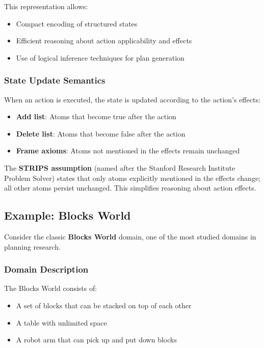\documentclass[11pt,a4paper]{article}
\theoremstyle{definition}
\theoremstyle{plain}
\theoremstyle{remark}
\begin{document}
This representation allows:
\begin{itemize}
    \item Compact encoding of structured states
    \item Efficient reasoning about action applicability and effects
    \item Use of logical inference techniques for plan generation
\end{itemize}

\subsubsection{State Update Semantics}

When an action is executed, the state is updated according to the action's effects:

\begin{itemize}
    \item \textbf{Add list}: Atoms that become true after the action
    \item \textbf{Delete list}: Atoms that become false after the action
    \item \textbf{Frame axioms}: Atoms not mentioned in the effects remain unchanged
\end{itemize}

The \textbf{STRIPS assumption} (named after the Stanford Research Institute Problem Solver) states that only atoms explicitly mentioned in the effects change; all other atoms persist unchanged. This simplifies reasoning about action effects.

\newpage

\subsection{Example: Blocks World}

Consider the classic \textbf{Blocks World} domain, one of the most studied domains in planning research.

\subsubsection{Domain Description}

The Blocks World consists of:
\begin{itemize}
    \item A set of blocks that can be stacked on top of each other
    \item A table with unlimited space
    \item A robot arm that can pick up and put down blocks
\end{itemize}
\end{document}
